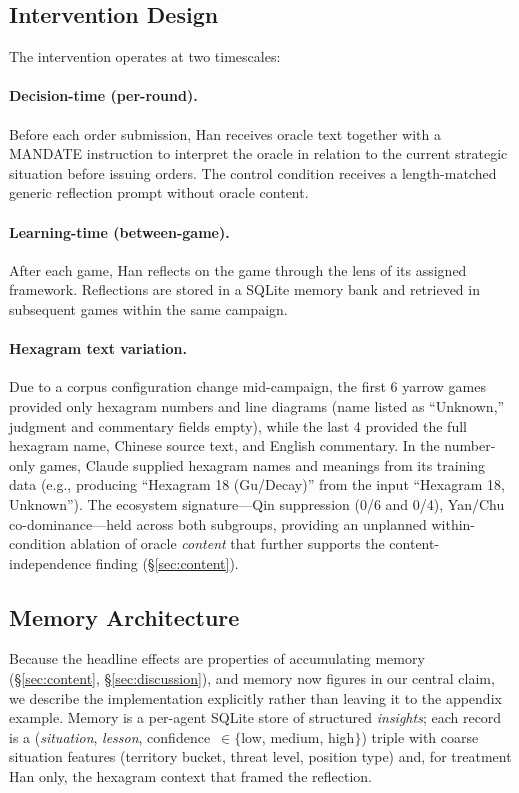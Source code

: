 \documentclass[11pt]{article}
\begin{document}
\subsection{Intervention Design}
\label{sec:intervention}

The intervention operates at two timescales:

\paragraph{Decision-time (per-round).} Before each order submission, Han receives oracle text together with a \textsc{MANDATE} instruction to interpret the oracle in relation to the current strategic situation before issuing orders. The control condition receives a length-matched generic reflection prompt without oracle content.

\paragraph{Learning-time (between-game).} After each game, Han reflects on the game through the lens of its assigned framework. Reflections are stored in a SQLite memory bank and retrieved in subsequent games within the same campaign.

\paragraph{Hexagram text variation.} Due to a corpus configuration change mid-campaign, the first 6 yarrow games provided only hexagram numbers and line diagrams (name listed as ``Unknown,'' judgment and commentary fields empty), while the last 4 provided the full hexagram name, Chinese source text, and English commentary. In the number-only games, Claude supplied hexagram names and meanings from its training data (e.g., producing ``Hexagram 18 (Gu/Decay)'' from the input ``Hexagram 18, Unknown''). The ecosystem signature---Qin suppression (0/6 and 0/4), Yan/Chu co-dominance---held across both subgroups, providing an unplanned within-condition ablation of oracle \emph{content} that further supports the content-independence finding (\S\ref{sec:content}).

\subsection{Memory Architecture}
\label{sec:memory}

Because the headline effects are properties of accumulating memory (\S\ref{sec:content}, \S\ref{sec:discussion}), and memory now figures in our central claim, we describe the implementation explicitly rather than leaving it to the appendix example. Memory is a per-agent SQLite store of structured \emph{insights}; each record is a (\emph{situation}, \emph{lesson}, confidence~$\in\{$low, medium, high$\}$) triple with coarse situation features (territory bucket, threat level, position type) and, for treatment Han only, the hexagram context that framed the reflection.
\end{document}
